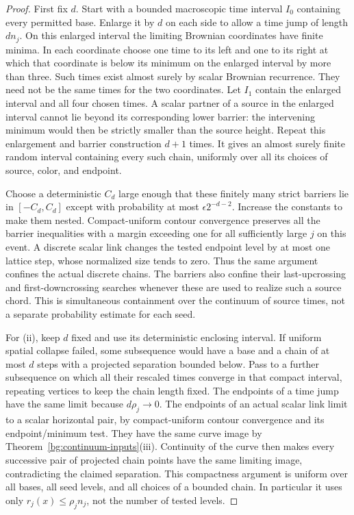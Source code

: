 \begin{proof}
First fix $d$.  Start with a bounded macroscopic time interval $I_0$
containing every permitted base.  Enlarge it by $d$ on each side to
allow a time jump of length $dn_j$.  On this enlarged interval the
limiting Brownian coordinates have finite minima.  In each coordinate
choose one time to its left and one to its right at which that
coordinate is below its minimum on the enlarged interval by more
than three.  Such times exist almost surely by scalar Brownian
recurrence.  They need not be the same times for the two coordinates.
Let $I_1$ contain the enlarged interval and all four chosen times.
A scalar partner of a source in the enlarged interval cannot lie
beyond its corresponding lower barrier: the intervening minimum
would then be strictly smaller than the source height.  Repeat this
enlargement and barrier construction $d+1$ times.  It gives an almost
surely finite random interval containing every such chain, uniformly
over all its choices of source, color, and endpoint.

Choose a deterministic $C_d$ large enough that these finitely many
strict barriers lie in $[-C_d,C_d]$ except with probability at most
$\epsilon2^{-d-2}$.  Increase the constants to make them nested.
Compact-uniform contour convergence preserves all the barrier
inequalities with a margin exceeding one for all sufficiently large
$j$ on this event.  A discrete scalar link changes the tested endpoint
level by at most one lattice step, whose normalized size tends to
zero.  Thus the same argument confines the actual discrete chains.
The barriers also confine their last-upcrossing and first-downcrossing
searches whenever these are used to realize such a source chord.
This is simultaneous containment over the continuum of source times,
not a separate probability estimate for each seed.

For (ii), keep $d$ fixed and use its deterministic enclosing interval.
If uniform spatial collapse failed, some subsequence would have a
base and a chain of at most $d$ steps with a projected separation
bounded below.  Pass to a further subsequence on which all their
rescaled times converge in that compact interval, repeating vertices
to keep the chain length fixed.  The endpoints of a time jump have
the same limit because $d\rho_j\to0$.  The endpoints of an actual
scalar link limit to a scalar horizontal pair, by compact-uniform
contour convergence and its endpoint/minimum test.  They have the
same curve image by Theorem~\ref{bg:continuum-inputs}(iii).
Continuity of the curve then makes every successive pair of projected
chain points have the same limiting image, contradicting the claimed
separation.  This compactness argument is uniform over all bases,
all seed levels, and all choices of a bounded chain.  In particular it
uses only $r_j(x)\le\rho_jn_j$, not the number of tested levels.


\end{proof}
